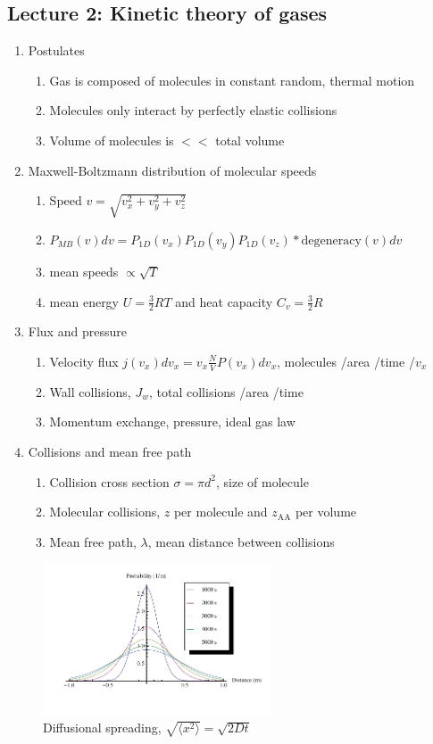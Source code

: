\documentclass[11pt]{article}
\begin{document}
\subsection{Lecture 2: Kinetic theory of gases}
\label{sec:orgb8c5653}
\begin{enumerate}
\item Postulates
\begin{enumerate}
\item Gas is composed of molecules in constant random, thermal motion
\item Molecules only interact by perfectly elastic collisions
\item Volume of molecules is \(<<\) total volume
\end{enumerate}
\item Maxwell-Boltzmann distribution of molecular speeds
\begin{enumerate}
\item Speed \(v=\sqrt{v_x^2+v_y^2+v_z^2}\)
\item \(P_{MB}(v) dv = P_{1D}(v_x) P_{1D}(v_y) P_{1D}(v_z) * \text{degeneracy}(v) dv\)
\item mean speeds \(\propto \sqrt{T}\)
\item mean energy \(U=\frac{3}{2} RT\) and heat capacity \(C_v=\frac{3}{2} R\)
\end{enumerate}
\item Flux and pressure
\begin{enumerate}
\item Velocity flux \(j(v_x) dv_x= v_x \frac{N}{V}P(v_x)dv_x\), molecules /area /time /\(v_x\)
\item Wall collisions, \(J_w\), total collisions /area /time
\item Momentum exchange, pressure, ideal gas law
\end{enumerate}
\item Collisions and mean free path
\begin{enumerate}
\item Collision cross section \(\sigma=\pi d^2\), size of molecule
\item Molecular collisions, \(z\) per molecule and \(z_{\mathrm{AA}}\) per volume
\item Mean free path, \(\lambda\), mean distance between collisions
\end{enumerate}
\end{enumerate}

\begin{figure}[htbp]
\centering
\includegraphics[width=0.6\textwidth]{./Images/Diffusion.pdf}
\caption{Diffusional spreading, \(\sqrt{\langle x^2 \rangle} = \sqrt{2 D t}\)}
\end{figure}
\end{document}
